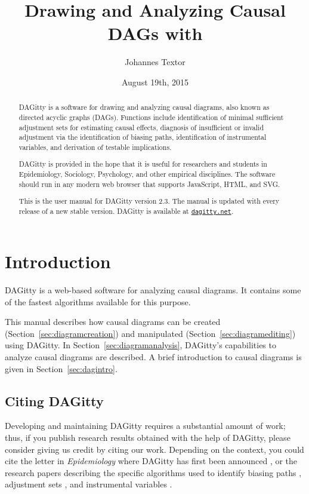 \documentclass[a4paper,10pt]{article}
\title{Drawing and Analyzing Causal DAGs with \pname}
\author{Johannes Textor}
\date{August 19th, 2015}
\newcommand{\pname}{{\sc DAG}itty\xspace}
\begin{document}
\maketitle

\begin{abstract}
\pname is a software for drawing and analyzing causal 
diagrams, also known as directed acyclic graphs (DAGs).
Functions include identification of minimal sufficient
adjustment sets for estimating causal effects, 
diagnosis of insufficient or invalid adjustment via the identification
of biasing paths, identification of instrumental variables, 
and derivation of testable implications.

\pname is provided in the hope that it is useful for researchers
and students in Epidemiology, Sociology, Psychology, and
other empirical disciplines. The software should run in any modern
web browser that supports JavaScript, HTML, and SVG.

This is the user manual for \pname version 2.3. The manual is updated with every 
release of a new stable version. \pname is available at 
\href{http://dagitty.net}{\tt dagitty.net}.
\end{abstract}

\tableofcontents

\section{Introduction}

\pname is a web-based software for analyzing causal diagrams. It contains some of the 
fastest algorithms available for this purpose. 

This manual describes how causal diagrams can be created
(Section~\ref{sec:diagramcreation}) 
and manipulated (Section~\ref{sec:diagramediting}) using \pname. In 
Section~\ref{sec:diagramanalysis}, \pname's capabilities to analyze causal diagrams are
described. A brief introduction to causal diagrams is given
in Section~\ref{sec:dagintro}.

\subsection{Citing \pname}

Developing and maintaining \pname requires a substantial
amount of work; thus, if you publish research results obtained
with the help of \pname, please 
consider giving us credit by citing our work. 
Depending on the context, you could cite the 
letter in {\em Epidemiology} where \pname has first been announced \cite{Textor2011},
or the research papers describing the specific algorithms used
to identify biasing paths \cite{TextorL2011}, 
adjustment sets \cite{textor14_uai},
and instrumental variables \cite{zander15_instrument}.
\end{document}
